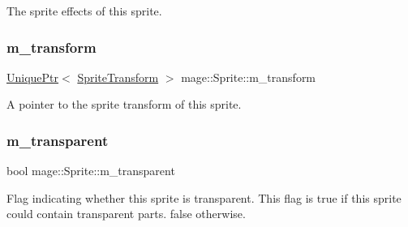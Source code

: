 The sprite effects of this sprite. \hypertarget{classmage_1_1_sprite_ae9907dd9d43fe2ce025bbc86b06dc7a3}{}\label{classmage_1_1_sprite_ae9907dd9d43fe2ce025bbc86b06dc7a3} 
\subsubsection{\texorpdfstring{m\+\_\+transform}{m\_transform}}
{\footnotesize\ttfamily \hyperlink{namespacemage_a3316d7143a973e37adf1110f2e80ca31}{Unique\+Ptr}$<$ \hyperlink{structmage_1_1_sprite_transform}{Sprite\+Transform} $>$ mage\+::\+Sprite\+::m\+\_\+transform\hspace{0.3cm}{\ttfamily [private]}}

A pointer to the sprite transform of this sprite. \hypertarget{classmage_1_1_sprite_a893427eff3913e5d37e75f4ee176ec46}{}\label{classmage_1_1_sprite_a893427eff3913e5d37e75f4ee176ec46} 
\subsubsection{\texorpdfstring{m\+\_\+transparent}{m\_transparent}}
{\footnotesize\ttfamily bool mage\+::\+Sprite\+::m\+\_\+transparent\hspace{0.3cm}{\ttfamily [private]}}

Flag indicating whether this sprite is transparent. This flag is {\ttfamily true} if this sprite could contain transparent parts. {\ttfamily false} otherwise. 